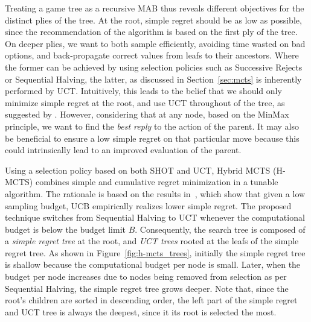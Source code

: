 \documentclass[a4paper]{llncs}
\begin{document}
Treating a game tree as a recursive MAB thus reveals different objectives for the distinct plies of the tree. At the root, simple regret should be as low as possible, since the recommendation of the algorithm is based on the first ply of the tree. On deeper plies, we want to both sample efficiently, avoiding time wasted on bad options, and back-propagate correct values from leafs to their ancestors. Where the former can be achieved by using selection policies such as Successive Rejects or Sequential Halving, the latter, as discussed in Section~\ref{sec:mcts} is inherently performed by UCT. Intuitively, this leads to the belief that we should only minimize simple regret at the root, and use UCT throughout of the tree, 
as suggested by \cite{tolpin2012mcts}.
However, considering that at any node, based on the MinMax principle, we want to find the \emph{best reply} to the action of the parent. It may also be beneficial to ensure a low simple regret on that particular move because this could intrinsically lead to an improved evaluation of the parent.


Using a selection policy based on both SHOT and UCT, Hybrid MCTS (H-MCTS) combines simple and cumulative regret minimization in a tunable algorithm. The rationale is based on the results in~\cite{Bubeck11Pure}, which show that given a low sampling budget, UCB empirically realizes lower simple regret. 
The proposed technique switches from Sequential Halving to UCT whenever the computational budget is below the budget limit $B$.
Consequently, the search tree is composed of a \emph{simple regret tree} at the root, and \emph{UCT trees} rooted at the leafs of the simple regret tree. As shown in Figure~\ref{fig:h-mcts_trees}, initially the simple regret tree is shallow because the computational budget per node is small. Later, when the budget per node increases due to nodes being removed from selection as per Sequential Halving, the simple regret tree grows deeper. Note that, since the root's children are sorted in descending order, the left part of the simple regret and UCT tree is always the deepest, since it its root is selected the most.
\end{document}
